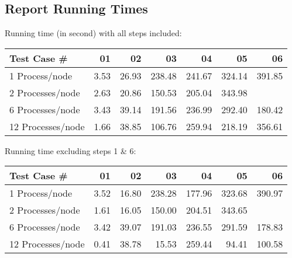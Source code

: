 \documentclass{article}
\begin{document}
\subsection{Report Running Times}

Running time (in second) with all steps included:

\begin{center}
  \begin{tabular}{| l | r | r | r | r | r | r |}
    \hline
    Test Case \# & 01 & 02 & 03 & 04 & 05 & 06  \\ \hline
    1 Process/node & 3.53 & 26.93 & 238.48 & 241.67 & 324.14 & 391.85 \\ \hline
    2 Processes/node & 2.63 & 20.86 & 150.53 & 205.04 & 343.98 &  \\ \hline
    6 Processes/node & 3.43 & 39.14 & 191.56 & 236.99 & 292.40 & 180.42 \\ \hline
    12 Processes/node & 1.66 & 38.85 & 106.76 & 259.94 & 218.19 & 356.61 \\ \hline
  \end{tabular}
\end{center}


Running time excluding steps 1 \& 6:

\begin{center}
  \begin{tabular}{| l | r | r | r | r | r | r |}
    \hline
    Test Case \# & 01 & 02 & 03 & 04 & 05 & 06  \\ \hline
    1 Process/node & 3.52 & 16.80 & 238.28 & 177.96 & 323.68 & 390.97 \\ \hline
    2 Processes/node & 1.61 & 16.05 & 150.00 & 204.51 & 343.65 &  \\ \hline
    6 Processes/node & 3.42 & 39.07 & 191.03 & 236.55 & 291.59 & 178.83 \\ \hline
    12 Processes/node & 0.41 & 38.78 & 15.53 & 259.44 & 94.41 & 100.58 \\ \hline
  \end{tabular}
\end{center}
\end{document}
